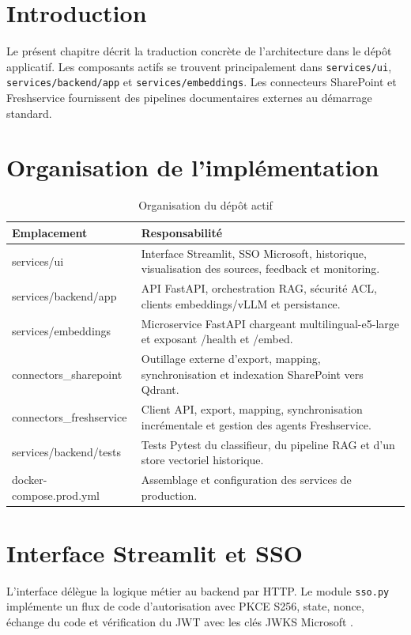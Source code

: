 \section{Introduction}
Le présent chapitre décrit la traduction concrète de l'architecture dans le dépôt applicatif. Les composants actifs se trouvent principalement dans \texttt{services/ui}, \texttt{services/backend/app} et \texttt{services/embeddings}. Les connecteurs SharePoint et Freshservice fournissent des pipelines documentaires externes au démarrage standard.

\section{Organisation de l'implémentation}
\begin{table}[H]
\centering
\caption{Organisation du dépôt actif}
\label{tab:repo_ch6}
\begin{tabular}{p{4.1cm}p{9.0cm}}
\toprule
\textbf{Emplacement} & \textbf{Responsabilité} \\
\midrule
services/ui & Interface Streamlit, SSO Microsoft, historique, visualisation des sources, feedback et monitoring. \\
services/backend/app & API FastAPI, orchestration RAG, sécurité ACL, clients embeddings/vLLM et persistance. \\
services/embeddings & Microservice FastAPI chargeant multilingual-e5-large et exposant /health et /embed. \\
connectors\_sharepoint & Outillage externe d’export, mapping, synchronisation et indexation SharePoint vers Qdrant. \\
connectors\_freshservice & Client API, export, mapping, synchronisation incrémentale et gestion des agents Freshservice. \\
services/backend/tests & Tests Pytest du classifieur, du pipeline RAG et d’un store vectoriel historique. \\
docker-compose.prod.yml & Assemblage et configuration des services de production. \\
\bottomrule
\end{tabular}
\end{table}

\section{Interface Streamlit et SSO}
L'interface délègue la logique métier au backend par HTTP. Le module \texttt{sso.py} implémente un flux de code d'autorisation avec PKCE S256, state, nonce, échange du code et vérification du JWT avec les clés JWKS Microsoft \citep{MicrosoftOAuth2026}.

